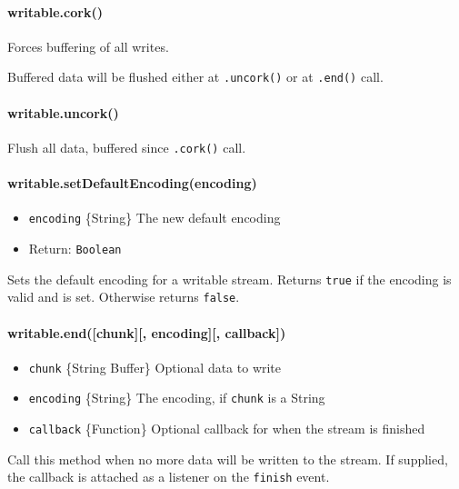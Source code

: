 \paragraph{writable.cork()}\label{writable.cork}

Forces buffering of all writes.

Buffered data will be flushed either at \texttt{.uncork()} or at
\texttt{.end()} call.

\paragraph{writable.uncork()}\label{writable.uncork}

Flush all data, buffered since \texttt{.cork()} call.

\paragraph{writable.setDefaultEncoding(encoding)}\label{writable.setdefaultencodingencoding}

\begin{itemize}
\itemsep1pt\parskip0pt
\item
  \texttt{encoding} \{String\} The new default encoding
\item
  Return: \texttt{Boolean}
\end{itemize}

Sets the default encoding for a writable stream. Returns \texttt{true}
if the encoding is valid and is set. Otherwise returns \texttt{false}.

\paragraph{writable.end({[}chunk{]}{[}, encoding{]}{[},
callback{]})}\label{writable.endchunk-encoding-callback}

\begin{itemize}
\itemsep1pt\parskip0pt
\item
  \texttt{chunk} \{String \textbar{} Buffer\} Optional data to write
\item
  \texttt{encoding} \{String\} The encoding, if \texttt{chunk} is a
  String
\item
  \texttt{callback} \{Function\} Optional callback for when the stream
  is finished
\end{itemize}

Call this method when no more data will be written to the stream. If
supplied, the callback is attached as a listener on the \texttt{finish}
event.

